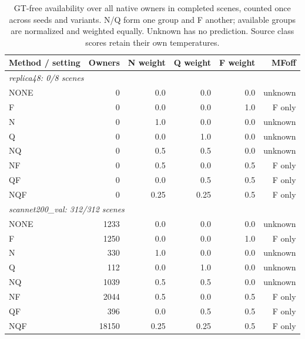 \begin{table}[t]
\centering
\small
\caption{GT-free availability over all native owners in completed scenes, counted once across seeds and variants. N/Q form one group and F another; available groups are normalized and weighted equally. Unknown has no prediction. Source class scores retain their own temperatures.}
\label{tab:benchmark-s3}
\begin{tabular}{lrrrrr}
\toprule
Method / setting & Owners & N weight & Q weight & F weight & MFoff \\
\midrule
\multicolumn{6}{l}{\emph{replica48: 0/8 scenes}} \\
NONE & 0 & 0.0 & 0.0 & 0.0 & unknown \\
F & 0 & 0.0 & 0.0 & 1.0 & F only \\
N & 0 & 1.0 & 0.0 & 0.0 & unknown \\
Q & 0 & 0.0 & 1.0 & 0.0 & unknown \\
NQ & 0 & 0.5 & 0.5 & 0.0 & unknown \\
NF & 0 & 0.5 & 0.0 & 0.5 & F only \\
QF & 0 & 0.0 & 0.5 & 0.5 & F only \\
NQF & 0 & 0.25 & 0.25 & 0.5 & F only \\
\midrule
\multicolumn{6}{l}{\emph{scannet200\_val: 312/312 scenes}} \\
NONE & 1233 & 0.0 & 0.0 & 0.0 & unknown \\
F & 1250 & 0.0 & 0.0 & 1.0 & F only \\
N & 330 & 1.0 & 0.0 & 0.0 & unknown \\
Q & 112 & 0.0 & 1.0 & 0.0 & unknown \\
NQ & 1039 & 0.5 & 0.5 & 0.0 & unknown \\
NF & 2044 & 0.5 & 0.0 & 0.5 & F only \\
QF & 396 & 0.0 & 0.5 & 0.5 & F only \\
NQF & 18150 & 0.25 & 0.25 & 0.5 & F only \\
\bottomrule
\end{tabular}
\end{table}
